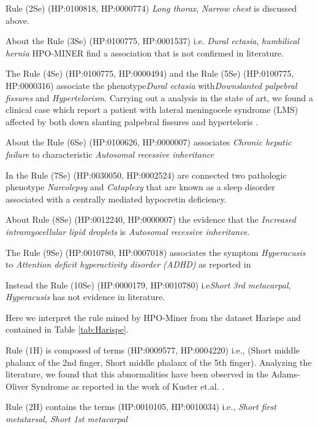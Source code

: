 \documentclass{article}
\theoremstyle{definition}
\begin{document}
Rule (2Se) (HP:0100818, HP:0000774) \textit{Long thorax}, \textit{Narrow chest} is discussed above.

About the Rule (3Se) (HP:0100775, HP:0001537) i.e. \textit{Dural ectasia}, \textit{humbilical hernia} HPO-MINER find a association that is not confirmed in literature. 

The Rule (4Se) (HP:0100775, HP:0000494) and the Rule (5Se) (HP:0100775, HP:0000316) associate the phenotype\textit{Dural ectasia} with\textit{Downslanted palpebral fissures} and \textit{Hypertelorism}. Carrying out a analysis in the state of art, we found a clinical case which report a patient with lateral meningocele syndrome (LMS) affected by both down slanting palpebral fissures and hyperteloris \cite{chen2005lateral}.

About the Rule (6Se) (HP:0100626, HP:0000007) associates \textit{Chronic hepatic failure} to characteristic \textit{Autosomal recessive inheritance}
\cite{blumberg1969hepatitis}

In the Rule (7Se) (HP:0030050, HP:0002524) are connected two pathologic phenotype \textit{Narcolepsy} and \textit{Cataplexy} that are known as a sleep disorder associated with a centrally mediated hypocretin deficiency\cite{mignot2001complex}.

About Rule (8Se) (HP:0012240, HP:0000007) the evidence that the \textit{Increased intramyocellular lipid droplets} is \textit{Autosomal recessive inheritance}.

The Rule (9Se) (HP:0010780, HP:0007018) associates the symptom  \textit{Hyperacusis} to \textit{Attention deficit hyperactivity disorder (ADHD)} as reported in\cite{einfeld1995issues}

Instead the Rule (10Se) (HP:0000179, HP:0010780) i.e\textit{Short 3rd metacarpal}, \textit{Hyperacusis}  has not evidence in literature. 

Here we interpret the rule mined by HPO-Miner from the dataset Harispe and contained in Table \ref{tab:Harispe}.

Rule (1H) is composed of terms (HP:0009577, HP:0004220)	i.e., (Short middle phalanx of the 2nd finger, Short middle phalanx of the 5th finger). Analyzing the literature, we found that this abnormalities have been observed in the Adams-Oliver Syndrome as reported in the work of Kuster et.al. \cite{kuster1988congenital}.

Rule (2H) contains the terms	(HP:0010105, HP:0010034) i.e., \textit{Short first metatarsal, Short 1st metacarpal} 
\end{document}

